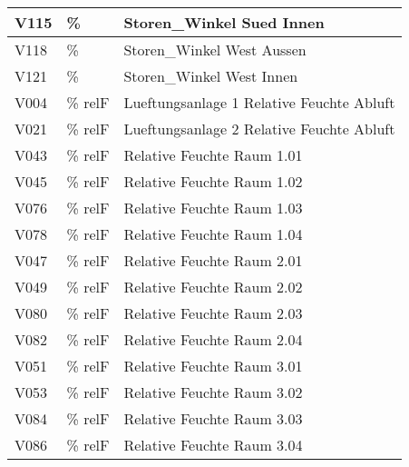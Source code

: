 \begin{table}[htbp]
\begin{tabular}{|l|l|l|}
    \hline
    \rowcolor[rgb]{ .863,  .902,  .945} V115 & \%   & Storen\_Winkel Sued Innen \bigstrut\\
    \hline
    \rowcolor[rgb]{ .863,  .902,  .945} V118 & \%   & Storen\_Winkel West Aussen \bigstrut\\
    \hline
    \rowcolor[rgb]{ .863,  .902,  .945} V121 & \%   & Storen\_Winkel West Innen \bigstrut\\
    \hline
    \rowcolor[rgb]{ .992,  .914,  .851} V004 & \% relF & Lueftungsanlage 1 Relative Feuchte Abluft \bigstrut\\
    \hline
    \rowcolor[rgb]{ .992,  .914,  .851} V021 & \% relF & Lueftungsanlage 2 Relative Feuchte Abluft \bigstrut\\
    \hline
    \rowcolor[rgb]{ .992,  .914,  .851} V043 & \% relF & Relative Feuchte Raum 1.01  \bigstrut\\
    \hline
    \rowcolor[rgb]{ .992,  .914,  .851} V045 & \% relF & Relative Feuchte Raum 1.02  \bigstrut\\
    \hline
    \rowcolor[rgb]{ .992,  .914,  .851} V076 & \% relF & Relative Feuchte Raum 1.03  \bigstrut\\
    \hline
    \rowcolor[rgb]{ .992,  .914,  .851} V078 & \% relF & Relative Feuchte Raum 1.04  \bigstrut\\
    \hline
    \rowcolor[rgb]{ .992,  .914,  .851} V047 & \% relF & Relative Feuchte Raum 2.01  \bigstrut\\
    \hline
    \rowcolor[rgb]{ .992,  .914,  .851} V049 & \% relF & Relative Feuchte Raum 2.02  \bigstrut\\
    \hline
    \rowcolor[rgb]{ .992,  .914,  .851} V080 & \% relF & Relative Feuchte Raum 2.03  \bigstrut\\
    \hline
    \rowcolor[rgb]{ .992,  .914,  .851} V082 & \% relF & Relative Feuchte Raum 2.04  \bigstrut\\
    \hline
    \rowcolor[rgb]{ .992,  .914,  .851} V051 & \% relF & Relative Feuchte Raum 3.01  \bigstrut\\
    \hline
    \rowcolor[rgb]{ .992,  .914,  .851} V053 & \% relF & Relative Feuchte Raum 3.02  \bigstrut\\
    \hline
    \rowcolor[rgb]{ .992,  .914,  .851} V084 & \% relF & Relative Feuchte Raum 3.03  \bigstrut\\
    \hline
    \rowcolor[rgb]{ .992,  .914,  .851} V086 & \% relF & Relative Feuchte Raum 3.04  \bigstrut\\
    \end{tabular}%
  \label{tab:appendix_A}%
\end{table}%


